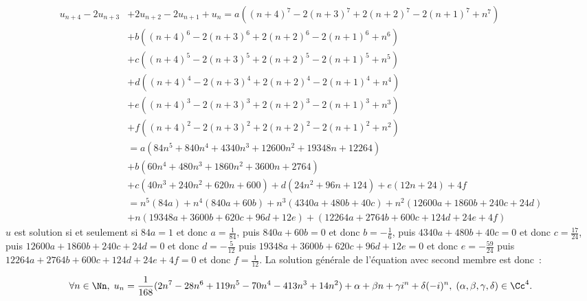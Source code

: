 {\begin{enumerate}
{\begin{align*}
u_{n+4}-2u_{n+3}&+2u_{n+2}-2u_{n+1}+u_n=a((n+4)^7-2(n+3)^7+2(n+2)^7-2(n+1)^7+n^7)\\
 &+b((n+4)^6-2(n+3)^6+2(n+2)^6-2(n+1)^6+n^6)\\
 &+c((n+4)^5-2(n+3)^5+2(n+2)^5-2(n+1)^5+n^5)\\
 &+d((n+4)^4-2(n+3)^4+2(n+2)^4-2(n+1)^4+n^4)\\
 &+e((n+4)^3-2(n+3)^3+2(n+2)^3-2(n+1)^3+n^3)\\
 &+f((n+4)^2-2(n+3)^2+2(n+2)^2-2(n+1)^2+n^2)\\
 &=a(84n^5+840n^4+4340n^3+12600n^2+19348n+12264)\\
 &+b(60n^4+480n^3+1860n^2+3600n+2764)\\
 &+c(40n^3+240n^2+620n+600)+d(24n^2+96n+124)+e(12n+24)+4f\\
 &=n^5(84a)+n^4(840a+60b)+n^3(4340a+480b+40c)+n^2(12600a+1860b+240c+24d)\\
 &+n(19348a+3600b+620c+96d+12e)+(12264a+2764b+600c+124d+24e+4f)
\end{align*}
$u$ est solution si et seulement si $84a=1$ et donc $a=\frac{1}{84}$, puis $840a+60b=0$ et donc $b=-\frac{1}{6}$,
puis $4340a+480b+40c=0$ et donc $c=\frac{17}{24}$, puis $12600a+1860b+240c+24d=0$ et donc $d=-\frac{5}{12}$
puis $19348a+3600b+620c+96d+12e=0$ et donc $e=-\frac{59}{24}$ puis $12264a+2764b+600c+124d+24e+4f=0$ et donc $f=\frac{1}{12}$.
La solution générale de l'équation avec second membre est donc~:

$$\forall n\in\Nn,\;u_n=\frac{1}{168}(2n^7-28n^6+119n^5-70n^4-413n^3+14n^2)+\alpha+\beta n+\gamma i^n+\delta(-i)^n,\; (\alpha,\beta,\gamma,\delta)\in\Cc^4.$$}
\end{enumerate}
}
